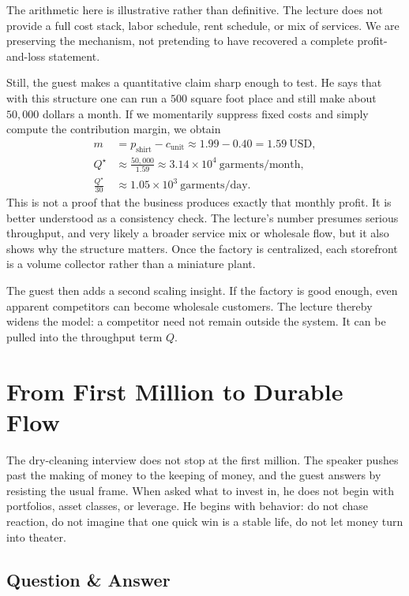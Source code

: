 \begin{remark}
The arithmetic here is illustrative rather than definitive. The lecture does not provide a full cost stack, labor schedule, rent schedule, or mix of services. We are preserving the mechanism, not pretending to have recovered a complete profit-and-loss statement.
\end{remark}

Still, the guest makes a quantitative claim sharp enough to test. He says that with this structure one can run a $500$ square foot place and still make about $50{,}000$ dollars a month. If we momentarily suppress fixed costs and simply compute the contribution margin, we obtain
\begin{align}
m &= p_{\text{shirt}} - c_{\text{unit}} \approx 1.99 - 0.40 = 1.59\ \text{USD}, \\
Q^\star &\approx \frac{50{,}000}{1.59} \approx 3.14\times 10^4\ \text{garments/month}, \\
\frac{Q^\star}{30} &\approx 1.05\times 10^3\ \text{garments/day}.
\end{align}
This is not a proof that the business produces exactly that monthly profit. It is better understood as a consistency check. The lecture's number presumes serious throughput, and very likely a broader service mix or wholesale flow, but it also shows why the structure matters. Once the factory is centralized, each storefront is a volume collector rather than a miniature plant.

The guest then adds a second scaling insight. If the factory is good enough, even apparent competitors can become wholesale customers. The lecture thereby widens the model: a competitor need not remain outside the system. It can be pulled into the throughput term $Q$.

\section{From First Million to Durable Flow}

The dry-cleaning interview does not stop at the first million. The speaker pushes past the making of money to the keeping of money, and the guest answers by resisting the usual frame. When asked what to invest in, he does not begin with portfolios, asset classes, or leverage. He begins with behavior: do not chase reaction, do not imagine that one quick win is a stable life, do not let money turn into theater.

\subsection{Question \& Answer}

